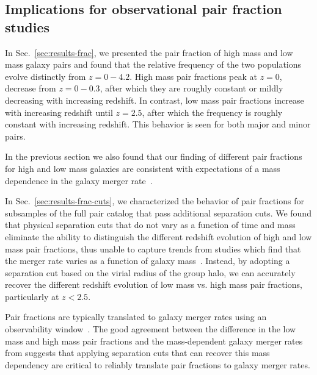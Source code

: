 \documentclass[twocolumn]{aastex631}
\begin{document}


\subsection{Implications for observational pair fraction studies}\label{sec:disc-obs}

    In Sec.~\ref{sec:results-frac}, we presented the pair fraction of high mass and low mass galaxy pairs and found that the relative frequency of the two populations evolve distinctly from $z=0-4.2$. 
    High mass pair fractions peak at $z=0$, decrease from $z=0-0.3$, after which they are roughly constant or mildly decreasing with increasing redshift. 
    In contrast, low mass pair fractions increase with increasing redshift until $z=2.5$, after which the frequency is roughly constant with increasing redshift. 
    This behavior is seen for both major and minor pairs.  

    In the previous section we also found that our finding of different pair fractions for high and low mass galaxies are consistent with expectations of a mass dependence in the galaxy merger rate~\citep{RG2015, Guzman-Ortega2023}. 

    In Sec.~\ref{sec:results-frac-cuts}, we characterized the behavior of pair fractions for subsamples of the full pair catalog that pass additional separation cuts.
    We found that physical separation cuts that do not vary as a function of time and mass eliminate the ability to distinguish the different redshift evolution of high and low mass pair fractions, thus unable to capture trends from studies which find that the merger rate varies as a function of galaxy mass~\citep{Stewart2009, Hopkins2010}. 
    Instead, by adopting a separation cut based on the virial radius of the group halo, we can accurately recover the different redshift evolution of low mass vs. high mass pair fractions, particularly at $z<2.5$.

    Pair fractions are typically translated to galaxy merger rates using an observability window~\citep{Lotz2011}.
    The good agreement between the difference in the low mass and high mass pair fractions and the mass-dependent galaxy merger rates from \cite{RG2015} suggests that applying separation cuts that can recover this mass dependency are critical to reliably translate pair fractions to galaxy merger rates. 
\end{document}
